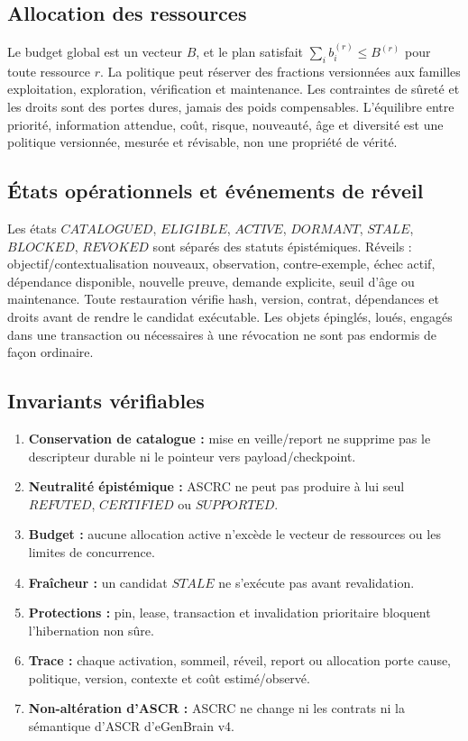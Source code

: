 \documentclass[11pt,a4paper]{article}
\begin{document}
\subsection{Allocation des ressources}
Le budget global est un vecteur $B$, et le plan satisfait $\sum_i b_i^{(r)}\leq B^{(r)}$ pour toute ressource $r$. La politique peut réserver des fractions versionnées aux familles exploitation, exploration, vérification et maintenance. Les contraintes de sûreté et les droits sont des portes dures, jamais des poids compensables. L'équilibre entre priorité, information attendue, coût, risque, nouveauté, âge et diversité est une politique versionnée, mesurée et révisable, non une propriété de vérité.

\subsection{États opérationnels et événements de réveil}
Les états $CATALOGUED$, $ELIGIBLE$, $ACTIVE$, $DORMANT$, $STALE$, $BLOCKED$, $REVOKED$ sont séparés des statuts épistémiques. Réveils : objectif/contextualisation nouveaux, observation, contre-exemple, échec actif, dépendance disponible, nouvelle preuve, demande explicite, seuil d'âge ou maintenance. Toute restauration vérifie hash, version, contrat, dépendances et droits avant de rendre le candidat exécutable. Les objets épinglés, loués, engagés dans une transaction ou nécessaires à une révocation ne sont pas endormis de façon ordinaire.

\subsection{Invariants vérifiables}
\begin{enumerate}
\item \textbf{Conservation de catalogue :} mise en veille/report ne supprime pas le descripteur durable ni le pointeur vers payload/checkpoint.
\item \textbf{Neutralité épistémique :} ASCRC ne peut pas produire à lui seul $REFUTED$, $CERTIFIED$ ou $SUPPORTED$.
\item \textbf{Budget :} aucune allocation active n'excède le vecteur de ressources ou les limites de concurrence.
\item \textbf{Fraîcheur :} un candidat $STALE$ ne s'exécute pas avant revalidation.
\item \textbf{Protections :} pin, lease, transaction et invalidation prioritaire bloquent l'hibernation non sûre.
\item \textbf{Trace :} chaque activation, sommeil, réveil, report ou allocation porte cause, politique, version, contexte et coût estimé/observé.
\item \textbf{Non-altération d'ASCR :} ASCRC ne change ni les contrats ni la sémantique d'ASCR d'eGenBrain v4.
\end{enumerate}
\end{document}
